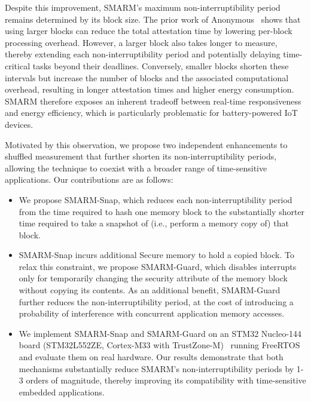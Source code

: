 \documentclass[conference]{IEEEtran}
\newcommand{\smarmcopy}{SMARM-Snap\xspace}
\newcommand{\smarmlock}{SMARM-Guard\xspace}
\begin{document}
Despite this improvement, SMARM's maximum non-interruptibility period remains determined by its block size. The prior work of Anonymous~\cite{smarmplus2026,carpent2018smarm} shows that using larger blocks can reduce the total attestation time by lowering per-block processing overhead. However, a larger block also takes longer to measure, thereby extending each non-interruptibility period and potentially delaying time-critical tasks beyond their deadlines. Conversely, smaller blocks shorten these intervals but increase the number of blocks and the associated computational overhead, resulting in longer attestation times and higher energy consumption. SMARM therefore exposes an inherent tradeoff between real-time responsiveness and energy efficiency, which is particularly problematic for battery-powered IoT devices.


Motivated by this observation, we propose two independent enhancements to shuffled measurement that further shorten its non-interruptibility periods, allowing the technique to coexist with a broader range of time-sensitive applications.
Our contributions are as follows:

\begin{itemize}
\item We propose \smarmcopy, which reduces each non-interruptibility period from the time required to hash one memory block to the substantially shorter time required to take a snapshot of (i.e., perform a memory copy of) that block.

 

\item \smarmcopy incurs additional Secure memory to hold a copied block. To relax this constraint, we propose \smarmlock, which disables interrupts only for temporarily changing the security attribute of the memory block without copying its contents.
As an additional benefit, \smarmlock further reduces the non-interruptibility period, at the cost of introducing a probability of interference with concurrent application memory accesses.

\item We implement \smarmcopy and \smarmlock on an STM32 Nucleo-144 board (STM32L552ZE, Cortex-M33 with TrustZone-M)~\cite{stm32nucleo144} running FreeRTOS and evaluate them on real hardware. Our results demonstrate that both mechanisms substantially reduce SMARM's non-interruptibility periods by 1-3 orders of magnitude, thereby improving its compatibility with time-sensitive embedded applications.


\end{itemize}
\end{document}
